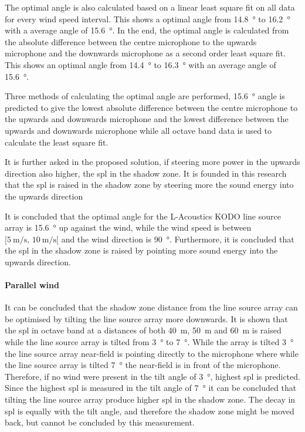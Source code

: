 The optimal angle is also calculated based on a linear least square fit on all data for every wind speed interval. This shows a optimal angle from \SI{14.8}{\degree} to \SI{16.2}{\degree} with a average angle of \SI{15.6}{\degree}. In the end, the optimal angle is calculated from the absolute difference between the centre microphone to the upwards microphone and the downwards microphone as a second order least square fit. This shows an optimal angle from \SI{14.4}{\degree} to \SI{16.3}{\degree} with an average angle of \SI{15.6}{\degree}. 

Three methods of calculating the optimal angle are performed, \SI{15.6}{\degree} angle is predicted to give the lowest absolute difference between the centre microphone to the upwards and downwards microphone and the lowest difference between the upwards and downwards microphone while all octave band data is used to calculate the least square fit.

It is further asked in the proposed solution, if steering more power in the upwards direction also higher, the \gls{spl} in the shadow zone. It is founded in this research that the \gls{spl} is raised in the shadow zone by steering more the sound energy into the upwards direction 

It is concluded that the optimal angle for the L-Acoustics KODO line source array is \SI{15.6}{\degree} up against the wind, while the wind speed is between $[\SI{5}{\meter\per\second},\, \SI{10}{\meter\per\second}[ $ and the wind direction is \SI{90}{\degree}. Furthermore, it is concluded that the \gls{spl} in the shadow zone is raised by pointing more sound energy into the upwards direction. 





\paragraph{Parallel wind}
It can be concluded that the shadow zone distance from the line source array can be optimised by tilting the line source array more downwards. It is shown that the \gls{spl} in octave band at a distances of both \SI{40}{\meter}, \SI{50}{\meter} and \SI{60}{\meter} is raised while the line source array is tilted from \SI{3}{\degree} to \SI{7}{\degree}. 
While the array is tilted \SI{3}{\degree} the line source array near-field is pointing directly to the microphone where while the line source array is tilted \SI{7}{\degree} the near-field is in front of the microphone. Therefore, if no wind were present in the tilt angle of \SI{3}{\degree}, highest \gls{spl} is predicted. Since the highest \gls{spl} is measured in the tilt angle of \SI{7}{\degree} it can be concluded that tilting the line source array produce higher \gls{spl} in the shadow zone. The decay in \gls{spl} is equally with the tilt angle, and therefore the shadow zone might be moved back, but cannot be concluded by this measurement.

